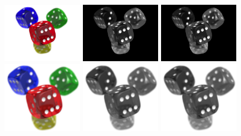 \begin{figure}[H]
    \centering

    \includegraphics[width=0.30\textwidth]{images/dice.png}
    \includegraphics[width=0.30\textwidth]{images/results/grayscale-cv.dice.png}
    \includegraphics[width=0.30\textwidth]{images/results/grayscale-my.dice.png}
    \\
    \includegraphics[width=0.30\textwidth]{images/dice_large.png}
    \includegraphics[width=0.30\textwidth]{images/results/grayscale-cv.dice_large.png}
    \includegraphics[width=0.30\textwidth]{images/results/grayscale-my.dice_large.png}

\end{figure}
